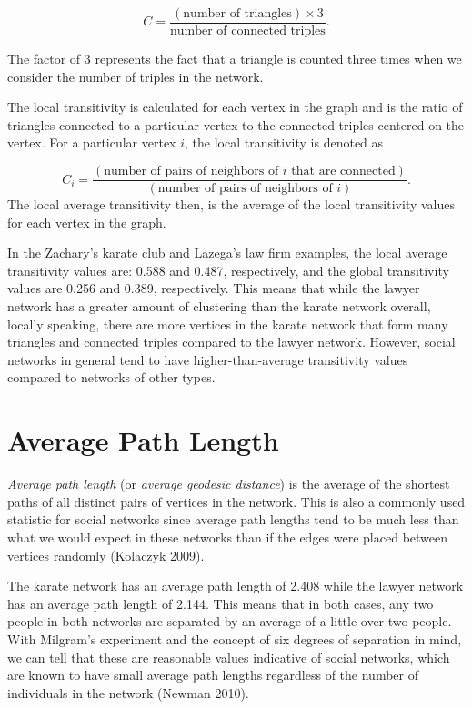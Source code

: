 \documentclass[12pt,twoside]{amherstthesis}
\begin{document}
  \[C = \frac {(\text{number of triangles}) \times 3} {\text{number of connected triples}}.\]
  
  The factor of \(3\) represents the fact that a triangle is counted three
  times when we consider the number of triples in the network.
  
  The local transitivity is calculated for each vertex in the graph and is
  the ratio of triangles connected to a particular vertex to the connected
  triples centered on the vertex. For a particular vertex \(i\), the local
  transitivity is denoted as
  
  \[ C_{i} = \frac {(\text{number of pairs of neighbors of } i \text{ that are connected})} {(\text{number of pairs of neighbors of } i)}.\]
  The local average transitivity then, is the average of the local
  transitivity values for each vertex in the graph.
  
  In the Zachary's karate club and Lazega's law firm examples, the local
  average transitivity values are: 0.588 and 0.487, respectively, and the
  global transitivity values are 0.256 and 0.389, respectively. This means
  that while the lawyer network has a greater amount of clustering than
  the karate network overall, locally speaking, there are more vertices in
  the karate network that form many triangles and connected triples
  compared to the lawyer network. However, social networks in general tend
  to have higher-than-average transitivity values compared to networks of
  other types.
  
  \section{Average Path Length}\label{average-path-length}
  
  \emph{Average path length} (or \emph{average geodesic distance}) is the
  average of the shortest paths of all distinct pairs of vertices in the
  network. This is also a commonly used statistic for social networks
  since average path lengths tend to be much less than what we would
  expect in these networks than if the edges were placed between vertices
  randomly (Kolaczyk 2009).
  
  The karate network has an average path length of 2.408 while the lawyer
  network has an average path length of 2.144. This means that in both
  cases, any two people in both networks are separated by an average of a
  little over two people. With Milgram's experiment and the concept of six
  degrees of separation in mind, we can tell that these are reasonable
  values indicative of social networks, which are known to have small
  average path lengths regardless of the number of individuals in the
  network (Newman 2010).
  
\end{document}
